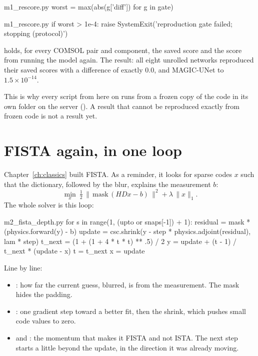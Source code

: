 \begin{code*}{m1_rescore.py}
    worst = max(abs(g['diff']) for g in gate)
\end{code*}
\begin{code*}{m1_rescore.py}
    if worst > 1e-4:
        raise SystemExit('reproduction gate failed; stopping (protocol)')
\end{code*}

 holds, for every COMSOL pair and component, the saved score and the score from running the model again.
The result: all eight unrolled networks reproduced their saved scores with a difference of exactly 0.0, and MAGIC-UNet
to $1.5\times10^{-14}$.

\begin{keyidea}
This is why every script from here on runs from a frozen copy of the code in its own folder on the server
(). A result that cannot be reproduced exactly from frozen code is not a result yet.
\end{keyidea}

\section{FISTA again, in one loop}

Chapter~\ref{ch:classics} built FISTA. As a reminder, it looks for sparse codes $x$ such that the dictionary, followed by
the blur, explains the measurement $b$:
\[
\min_x\ \tfrac12\,\|\,\text{mask}\,(H D x - b)\,\|^2+\lambda\,\|x\|_1 .
\]
The whole solver is this loop:

\begin{code*}{m2_fista_depth.py}
        for s in range(1, (upto or snaps[-1]) + 1):
            residual = mask * (physics.forward(y) - b)
            update = csc.shrink(y - step * physics.adjoint(residual), lam * step)
            t_next = (1 + (1 + 4 * t * t) ** .5) / 2
            y = update + (t - 1) / t_next * (update - x)
            t = t_next
            x = update
\end{code*}

Line by line:
\begin{itemize}
\item {}: how far the current guess, blurred, is from the measurement. The mask hides the padding.
\item {}: one gradient step toward a better fit, then the shrink, which pushes small code values to zero.
\item {} and : the momentum that makes it FISTA and not ISTA. The next step starts a little beyond
the update, in the direction it was already moving.
\end{itemize}

